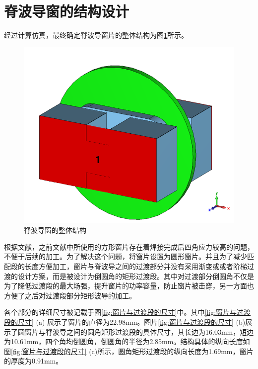 \documentclass[master]{thesis-uestc}
\begin{document}
\section{脊波导窗的结构设计}
经过计算仿真，最终确定脊波导窗片的整体结构为图\ref{fig:脊波导窗的整体结构}所示。
\begin{figure}[!htb]
    \centering
    \includegraphics[width=0.32\linewidth]{pic/chapter3/输入窗的总体视图.png}
    \caption{脊波导窗的整体结构}
    \label{fig:脊波导窗的整体结构}
\end{figure}

根据文献\cite{liqiu_drwwindow4_2011}，之前文献\cite{nie_drwwindow1_2012,wu_drwwindow2_2020,zhang_drwwindow3_2021}中所使用的方形窗片存在着焊接完成后四角应力较高的问题，不便于后续的加工。为了解决这个问题，将窗片设置为圆形窗片。并且为了减少匹配段的长度方便加工，窗片与脊波导之间的过渡部分并没有采用渐变或或者阶梯过渡的设计方案，而是被设计为倒圆角的矩形过渡段。其中对过渡部分倒圆角不仅是为了降低过渡段的最大场强，提升窗片的功率容量，防止窗片被击穿，另一方面也方便了之后对过渡段部分矩形波导的加工。

各个部分的详细尺寸被记载于图\ref{fig:窗片与过渡段的尺寸}中。其中\ref{fig:窗片与过渡段的尺寸} (a) 展示了窗片的直径为22.98mm。图片\ref{fig:窗片与过渡段的尺寸} (b)展示了圆窗片与脊波导之间的圆角矩形过渡段的具体尺寸，其长边为16.03mm，短边为10.61mm，四个角均倒圆角，倒圆角的半径为2.85mm。结构具体的纵向长度如图\ref{fig:窗片与过渡段的尺寸} (c)所示，圆角矩形过渡段的纵向长度为1.69mm，窗片的厚度为0.91mm。
\end{document}
